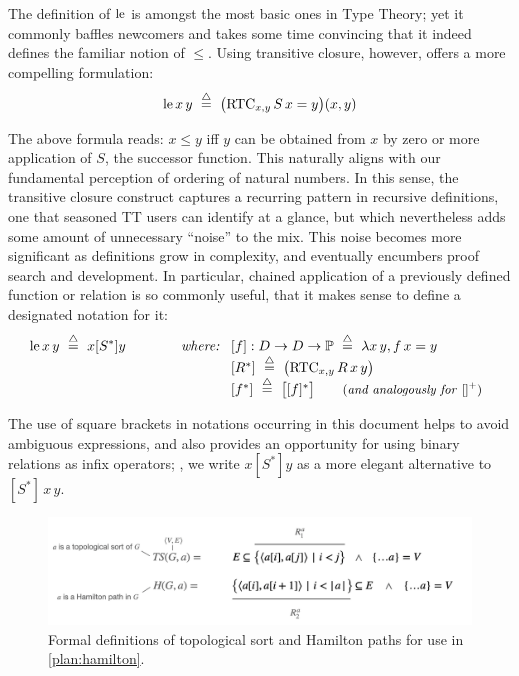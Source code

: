 The definition of $\mathrm{le}$ is amongst the most basic ones in Type Theory; yet it commonly baffles newcomers and takes some time convincing that it indeed defines the familiar notion of $\leq$.
Using transitive closure, however, offers a more compelling formulation:
\[
\mathrm{le}\,x\,y ~\overset{\triangle}{=}~ \big(\mathrm{RTC}_{x,y}\,S\,x=y\big)(x,y)
\]

The above formula reads: $x\leq y$ iff $y$ can be obtained from $x$ by zero or more application of $S$, the successor function.
This naturally aligns with our fundamental perception of ordering of natural numbers.
In this sense, the transitive closure construct captures a recurring pattern in recursive definitions, one that seasoned TT users can identify at a glance, but which nevertheless adds some amount of unnecessary ``noise'' to the mix.
This noise becomes more significant as definitions grow in complexity, and eventually encumbers proof search and development.
In particular, chained application of a previously defined function or relation is so commonly useful, that it makes sense to define a designated notation for it:
\[
\mathrm{le}\,x\,y ~\overset{\triangle}{=}~ x[S^*]y \hspace{4em}
\textit{where:}~
\begin{array}[t]{l}
  {} [f] : D\to D\to\mathbb{P} ~\overset{\triangle}{=}~ \lambda x\,y, f\,x=y \\
  {} [R^*] ~\overset{\triangle}{=}~ \big(\mathrm{RTC}_{x,y}\,R\,x\,y\big) \\
  {} [f^*] ~\overset{\triangle}{=}~ \big[[f]^*\big]  \qquad\textrm{\small(\textit{and analogously for} ${[]}^+$)}
\end{array}
\]

The use of square brackets in notations occurring in this document helps to avoid ambiguous expressions, and also provides an opportunity for using binary relations as infix operators;
\eg, we write $x[S^*]y$ as a more elegant alternative to $[S^*]\,x\,y$.

\begin{figure}
\begin{center}
\includegraphics[width=.8\textwidth]{img/topological-and-hamilton.png}
\end{center}
\caption{Formal definitions of topological sort and Hamilton paths
  for use in \autoref{plan:hamilton}.}
\label{plan:hamilton-defs}
\end{figure}

